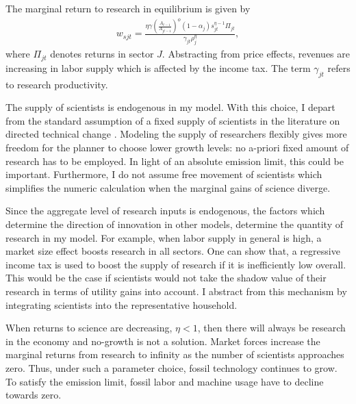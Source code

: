 The marginal return to research in equilibrium is  given by
\begin{align}
w_{sjt}= \frac{\eta \gamma \left(\frac{A_{t-1}}{A_{jt-1}}\right)^\phi (1-\alpha_j)s_{jt}^{\eta-1}\Pi_{jt}}{\gamma_{jt}\rho_j^\eta},
\end{align}
where $\Pi_{jt}$ denotes returns in sector $J$. Abstracting from price effects, revenues are increasing in labor supply which is affected by the income tax. The term $\gamma_{jt}$ refers to research productivity.

The supply of scientists is endogenous in my model. With this choice, I depart from the standard assumption of a fixed supply of scientists in the literature on directed technical change \citep{Acemoglu2012TheChange, Fried2018ClimateAnalysis}.  Modeling the supply of researchers flexibly gives more freedom for the planner to choose lower growth levels: no a-priori fixed amount of research has to be employed. In light of an absolute emission limit, this could be important. Furthermore, I do not assume free movement of scientists which simplifies the numeric calculation when the marginal gains of science diverge. 

Since the aggregate level of research inputs is endogenous, the factors which determine the direction of innovation in other models, determine the quantity of research in my model. For example, when labor supply in general is high, a market size effect boosts research in all sectors. One can show that, a regressive income tax is used to boost the supply of research if it   is inefficiently low overall. This would be the case if scientists would not take the  shadow value of their research in terms of utility gains into account. I abstract from this mechanism by integrating scientists into the representative household. 

When returns to science are decreasing, $\eta<1$, then there will always be research in the economy and no-growth is not a solution. Market forces increase the marginal returns from research to infinity as the number of scientists approaches zero. Thus, under such a parameter choice, fossil technology continues to grow. To satisfy the emission limit, fossil labor and machine usage have to decline towards zero. 



